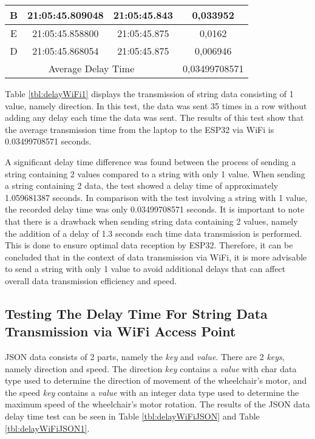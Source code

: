 \begin{table}[!h]
\begin{tabular}{|ccc|c|}
  \multicolumn{1}{|c|}{B}    & \multicolumn{1}{c|}{21:05:45.809048} & 21:05:45.843       & 0,033952      \\ \hline
  \multicolumn{1}{|c|}{E}    & \multicolumn{1}{c|}{21:05:45.858800} & 21:05:45.875       & 0,0162        \\ \hline
  \multicolumn{1}{|c|}{D}    & \multicolumn{1}{c|}{21:05:45.868054} & 21:05:45.875       & 0,006946      \\ \hline
  \multicolumn{3}{|c|}{Average Delay Time}                                               & 0,03499708571 \\ \hline
  \end{tabular}
\end{table}

Table \ref{tbl:delayWiFi1} displays the transmission of string data consisting of 1 value, namely direction. In this test, the data was sent 35 times in a row without adding any delay each time the data was sent. The results of this test show that the average transmission time from the laptop to the ESP32 via WiFi is 0.03499708571 seconds.

A significant delay time difference was found between the process of sending a string containing 2 values compared to a string with only 1 value. When sending a string containing 2 data, the test showed a delay time of approximately 1.059681387 seconds. In comparison with the test involving a string with 1 value, the recorded delay time was only 0.03499708571 seconds. It is important to note that there is a drawback when sending string data containing 2 values, namely the addition of a delay of 1.3 seconds each time data transmission is performed. This is done to ensure optimal data reception by ESP32. Therefore, it can be concluded that in the context of data transmission via WiFi, it is more advisable to send a string with only 1 value to avoid additional delays that can affect overall data transmission efficiency and speed.

\subsection{Testing The Delay Time For String Data Transmission via WiFi Access Point}

JSON data consists of 2 parts, namely the \emph{key} and \emph{value}. There are 2 \emph{keys}, namely direction and speed. The direction \emph{key} contains a \emph{value} with char data type used to determine the direction of movement of the wheelchair's motor, and the speed \emph{key} contains a \emph{value} with an integer data type used to determine the maximum speed of the wheelchair's motor rotation. The results of the JSON data delay time test can be seen in Table \ref{tbl:delayWiFiJSON} and Table \ref{tbl:delayWiFiJSON1}.

